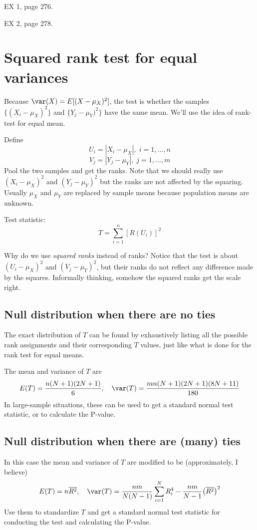 \documentclass[12pt]{article}
\begin{document}
\example EX 1, page 276.

\example EX 2, page 278.


\section{Squared rank test for equal variances}

Because $\var(X) = E[(X - \mu_X)^2]$,
the test is whether the samples
$\{(X_i - \mu_X)^2\}$ and $\{Y_j - \mu_Y)^2\}$
have the same mean.
We'll use the idea of rank-test for equal mean.

Define
\[
U_i = |X_i - \mu_X|, \; i = 1,\dotsc, n
\]
\[
V_j = |Y_j - \mu_Y|, \; j = 1,\dotsc, m
\]
Pool the two samples and get the ranks.
Note that we should really use
$(X_i - \mu_X)^2$ and $(Y_j - \mu_Y)^2$
but the ranks are not affected by the squaring.
Usually $\mu_X$ and $\mu_Y$ are replaced by
sample means because population means are unknown.

Test statistic:
\[
T = \sum_{i=1}^n [R(U_i)]^2
\]

\remark%
Why do we use \emph{squared ranks} instead of ranks?
Notice that the test is about
$(U_i - \mu_X)^2$ and $(V_j - \mu_Y)^2$,
but their ranks do not reflect any difference made by the squares.
Informally thinking,
somehow the squared ranks get the scale right.

\subsection{Null distribution when there are no ties}

The exact distribution of $T$ can be found by exhaustively listing
all the possible rank assignments and their corresponding $T$ values,
just like what is done for the rank test for equal means.

The mean and variance of $T$ are
\[
E(T) = \frac{n(N+1)(2N+1)}{6},\quad
\var(T) = \frac{mn(N+1)(2N+1)(8N+11)}{180}
\]
In large-sample situations,
these can be used to get a standard normal test statistic,
or to calculate the P-value.

\subsection{Null distribution when there are (many) ties}

In this case the mean and variance of $T$ are modified to be
(approximately, I believe)
\[
E(T) = n\overline{R^2},\quad
\var(T) = \frac{nm}{N(N-1)} \sum_{i=1}^N R_i^4
    - \frac{nm}{N-1} \bigl(\overline{R^2}\bigr)^2
\]
Use them to standardize $T$ and get a standard normal test statistic
for conducting the test and calculating the P-value.
\end{document}
